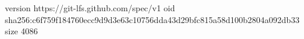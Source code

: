 version https://git-lfs.github.com/spec/v1
oid sha256:c6f759f184760ecc9d9d3e63c10756dda43d29bfc815a58d100b2804a092db33
size 4086

